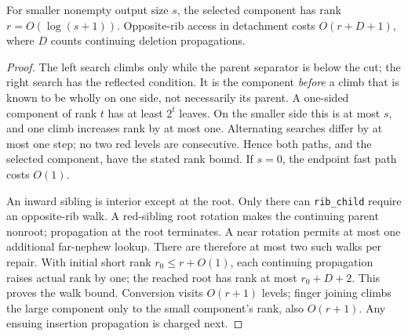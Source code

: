 \begin{lemma}
\label{lem:proof-finger}
For smaller nonempty output size $s$, the selected component has rank
$r=O(\log(s+1))$. Opposite-rib access in detachment costs $O(r+D+1)$,
where $D$ counts continuing deletion propagations.
\end{lemma}
\begin{proof}
The left search climbs only while the parent separator is below the cut;
the right search has the reflected condition. It is the component
\emph{before} a climb that is known to be wholly on one side, not necessarily
its parent. A one-sided component of rank $t$ has at least $2^t$ leaves.
On the smaller side this is at most $s$, and one climb increases rank by
at most one. Alternating searches differ by at most one step; no two red
levels are consecutive. Hence both paths, and the selected component,
have the stated rank bound. If $s=0$, the endpoint fast path costs $O(1)$.

An inward sibling is interior except at the root. Only there can
\texttt{rib\_child} require an opposite-rib walk. A red-sibling root rotation
makes the continuing parent nonroot; propagation at the root terminates.
A near rotation permits at most one additional far-nephew lookup.
There are therefore at most two such walks per repair. With initial short
rank $r_0\leq r+O(1)$, each continuing propagation raises actual rank by one;
the reached root has rank at most $r_0+D+2$.
This proves the walk bound. Conversion visits $O(r+1)$ levels;
finger joining climbs the large component only to the small component's
rank, also $O(r+1)$. Any ensuing insertion propagation is charged next.
\end{proof}

